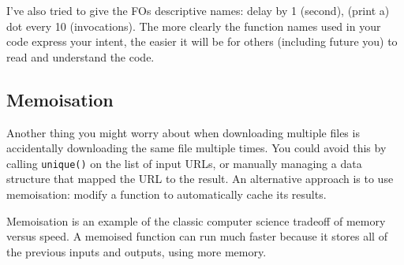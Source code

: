 I've also tried to give the FOs descriptive names: delay by 1 (second),
(print a) dot every 10 (invocations). The more clearly the function
names used in your code express your intent, the easier it will be for
others (including future you) to read and understand the code.

\subsection{Memoisation}

Another thing you might worry about when downloading multiple files is
accidentally downloading the same file multiple times. You could avoid
this by calling \texttt{unique()} on the list of input URLs, or manually
managing a data structure that mapped the URL to the result. An
alternative approach is to use memoisation: modify a function to
automatically cache its results. 

\begin{Shaded}
\begin{Highlighting}[]
\end{Highlighting}
\end{Shaded}

\begin{Shaded}
\begin{Highlighting}[]
\StringTok{ }
  \NormalTok{(}\NormalTok{)}
\NormalTok{\}}
\NormalTok{(}\NormalTok{())}
\NormalTok{(}\NormalTok{())}
\StringTok{ }
\NormalTok{(}\NormalTok{())}
\NormalTok{(}\NormalTok{())}
\end{Highlighting}
\end{Shaded}

Memoisation is an example of the classic computer science tradeoff of
memory versus speed. A memoised function can run much faster because it
stores all of the previous inputs and outputs, using more memory.

